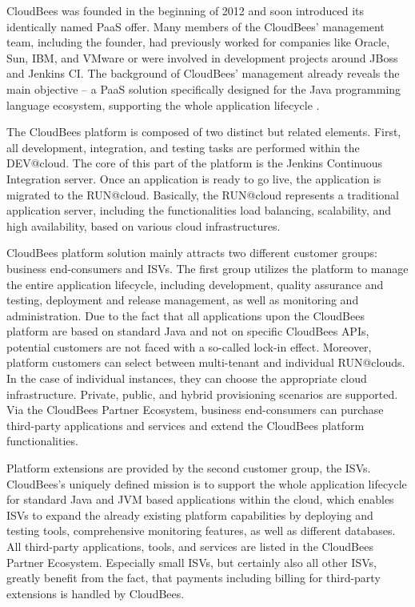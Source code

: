 CloudBees was founded in the beginning of 2012 and soon introduced its identically named \ac{PaaS} offer. Many members of the CloudBees' management team, including the founder, had previously worked for companies like Oracle, Sun, IBM, and VMware or were involved in development projects around JBoss and Jenkins CI. The background of CloudBees' management already reveals the main objective -- a \ac{PaaS} solution specifically designed for the Java programming language ecosystem, supporting the whole application lifecycle \citep{CloudBees2013}.

The CloudBees platform is composed of two distinct but related elements. First, all development, integration, and testing tasks are performed within the DEV@cloud. The core of this part of the platform is the Jenkins Continuous Integration server. Once an application is ready to go live, the application is migrated to the RUN@cloud. Basically, the RUN@cloud represents a traditional application server, including the functionalities load balancing, scalability, and high availability, based on various cloud infrastructures.

CloudBees platform solution mainly attracts two different customer groups: business end-consumers and \acp{ISV}. The first group utilizes the platform to manage the entire application lifecycle, including development, quality assurance and testing, deployment and release management, as well as monitoring and administration. Due to the fact that all applications upon the CloudBees platform are based on standard Java and not on specific CloudBees \acp{API}, potential customers are not faced with a so-called lock-in effect. Moreover, platform customers can select between multi-tenant and individual RUN@clouds. In the case of individual instances, they can choose the appropriate cloud infrastructure. Private, public, and hybrid provisioning scenarios are supported. Via the CloudBees Partner Ecosystem, business end-consumers can purchase third-party applications and services and extend the CloudBees platform functionalities. 

Platform extensions are provided by the second customer group, the \acp{ISV}. CloudBees's uniquely defined mission is to support the whole application lifecycle for standard Java and \ac{JVM} based applications within the cloud, which enables \acp{ISV} to expand the already existing platform capabilities by deploying and testing tools, comprehensive monitoring features, as well as different databases. All third-party applications, tools, and services are listed in the CloudBees Partner Ecosystem. Especially small \acp{ISV}, but certainly also all other \acp{ISV}, greatly benefit from the fact, that payments including billing for third-party extensions is handled by CloudBees.

